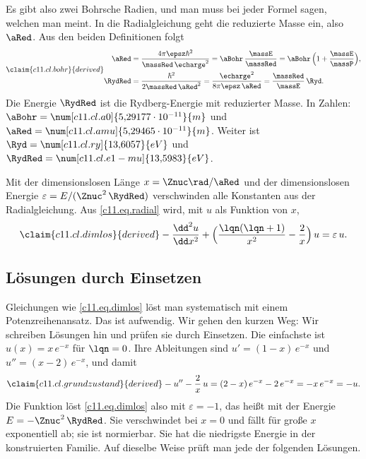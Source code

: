 

Es gibt also zwei Bohrsche Radien, und man muss bei jeder Formel sagen, welchen man
meint. In die Radialgleichung geht die reduzierte Masse ein, also $\aRed$. Aus den
beiden Definitionen folgt
\begin{equation}\label{c11.eq.bohr}\claim{c11.cl.bohr}{derived}
  \begin{aligned}
    \aRed &= \frac{4\pi\epsz\hbar^2}{\massRed\,\echarge^2}
           = \aBohr\,\frac{\massE}{\massRed}
           = \aBohr\,\Bigl(1 + \frac{\massE}{\massP}\Bigr), \\
    \RydRed &= \frac{\hbar^2}{2\massRed\,\aRed^2}
             = \frac{\echarge^2}{8\pi\epsz\,\aRed}
             = \frac{\massRed}{\massE}\,\Ryd .
  \end{aligned}
\end{equation}
Die Energie $\RydRed$ ist die Rydberg-Energie mit reduzierter Masse. In Zahlen:
$\aBohr = \num[c11.cl.a0]{5{,}29177 \cdot 10^{-11}}{m}$ und
$\aRed = \num[c11.cl.amu]{5{,}29465 \cdot 10^{-11}}{m}$. Weiter ist
$\Ryd = \num[c11.cl.ry]{13{,}6057}{eV}$ und
$\RydRed = \num[c11.cl.e1-mu]{13{,}5983}{eV}$.

Mit der dimensionslosen Länge $x = \Znuc\rad/\aRed$ und der dimensionslosen Energie
$\varepsilon = E/(\Znuc^2\,\RydRed)$ verschwinden alle Konstanten aus der
Radialgleichung. Aus \eqref{c11.eq.radial} wird, mit $u$ als Funktion von $x$,
\begin{equation}\label{c11.eq.dimlos}\claim{c11.cl.dimlos}{derived}
  -\frac{\dd^2 u}{\dd x^2} + \Bigl(\frac{\lqn(\lqn + 1)}{x^2} - \frac{2}{x}\Bigr)\,u
  = \varepsilon\,u .
\end{equation}

\subsection{Lösungen durch Einsetzen}\label{c11.s4.2}

Gleichungen wie \eqref{c11.eq.dimlos} löst man systematisch mit einem Potenzreihenansatz.
Das ist aufwendig. Wir gehen den kurzen Weg: Wir schreiben Lösungen hin und prüfen sie
durch Einsetzen. Die einfachste ist $u(x) = x\,e^{-x}$ für $\lqn = 0$. Ihre Ableitungen
sind $u' = (1 - x)\,e^{-x}$ und $u'' = (x - 2)\,e^{-x}$, und damit
\begin{equation}\label{c11.eq.grundzustand}\claim{c11.cl.grundzustand}{derived}
  -u'' - \frac{2}{x}\,u = (2 - x)\,e^{-x} - 2\,e^{-x} = -x\,e^{-x} = -u .
\end{equation}
Die Funktion löst \eqref{c11.eq.dimlos} also mit $\varepsilon = -1$, das heißt mit der
Energie $E = -\Znuc^2\,\RydRed$. Sie verschwindet bei $x = 0$ und fällt für große $x$
exponentiell ab; sie ist normierbar. Sie hat die niedrigste Energie in der
konstruierten Familie. Auf dieselbe Weise prüft man jede der folgenden Lösungen.

